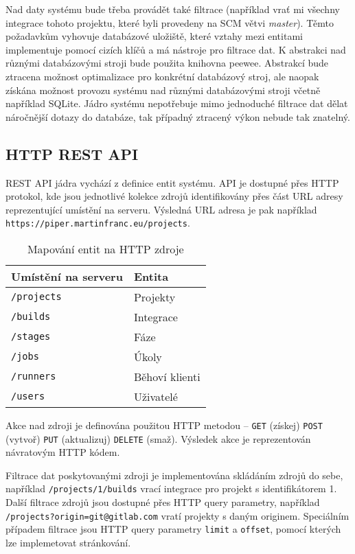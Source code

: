 
Nad daty systému bude třeba provádět také filtrace (například vrať mi všechny integrace tohoto projektu, které byli provedeny na SCM větvi \textit{master}).
Těmto požadavkům vyhovuje databázové uložiště, které vztahy mezi entitami implementuje pomocí cizích klíčů a má nástroje pro filtrace dat.
K abstrakci nad různými databázovými stroji bude použita knihovna peewee.
Abstrakcí bude ztracena možnost optimalizace pro konkrétní databázový stroj, ale naopak získána možnost provozu systému nad různými databázovými stroji včetně například SQLite.
Jádro systému nepotřebuje mimo jednoduché filtrace dat dělat náročnější dotazy do databáze, tak případný ztracený výkon nebude tak znatelný.

\subsection{HTTP REST API}

REST API jádra vychází z definice entit systému.
API je dostupné přes HTTP protokol, kde jsou jednotlivé kolekce zdrojů identifikovány přes část URL adresy reprezentující umístění na serveru.
Výsledná URL adresa je pak například \verb|https://piper.martinfranc.eu/projects|.

\begin{table}[ht]
\centering
\caption{Mapování entit na HTTP zdroje}
\begin{tabular}{|l|l|}
\hline
Umístění na serveru & Entita \\ \hline
\verb|/projects| & Projekty \\ \hline
\verb|/builds| & Integrace \\ \hline
\verb|/stages| & Fáze \\ \hline
\verb|/jobs| & Úkoly \\ \hline
\verb|/runners| & Běhoví klienti \\ \hline
\verb|/users| & Uživatelé \\ \hline
\end{tabular}
\end{table}

Akce nad zdroji je definována použitou HTTP metodou -- \verb|GET| (získej) \verb|POST| (vytvoř) \verb|PUT| (aktualizuj) \verb|DELETE| (smaž).
Výsledek akce je reprezentován návratovým HTTP kódem.

Filtrace dat poskytovanými zdroji je implementována skládáním zdrojů do sebe, například \verb|/projects/1/builds| vrací integrace pro projekt s identifikátorem 1.
Další filtrace zdrojů jsou dostupné přes HTTP query parametry, například \verb|/projects?origin=git@gitlab.com| vratí projekty s daným originem.
Speciálním případem filtrace jsou HTTP query parametry \verb|limit| a \verb|offset|, pomocí kterých lze implemetovat stránkování.

